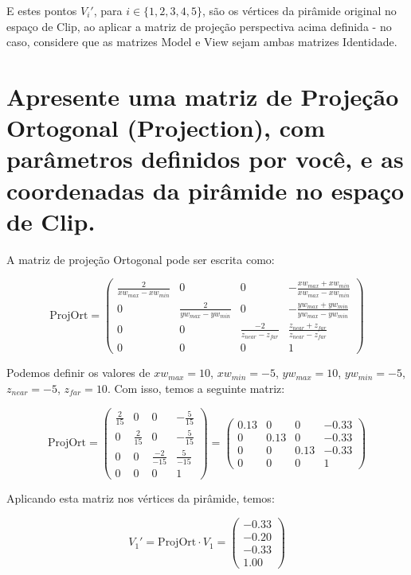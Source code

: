 \documentclass{article}
\begin{document}
E estes pontos $V_i'$, para $i \in \{1, 2, 3, 4, 5\}$, são os vértices da pirâmide original no espaço de Clip, ao aplicar a matriz de projeção perspectiva acima definida - no caso, considere que as matrizes Model e View sejam ambas matrizes Identidade.
\newpage

\section{Apresente uma matriz de Projeção Ortogonal (Projection), com parâmetros definidos por você, e as coordenadas da pirâmide no espaço de Clip.}

A matriz de projeção Ortogonal pode ser escrita como:

$$\text{ProjOrt} = \begin{pmatrix}
\frac{2}{xw_{max} - xw_{min}} & 0 & 0 & -\frac{xw_{max} + xw_{min}}{xw_{max} - xw_{min}} \\
0 & \frac{2}{yw_{max} - yw_{min}} & 0 & -\frac{yw_{max} + yw_{min}}{yw_{max} - yw_{min}} \\
0 & 0 & \frac{-2}{z_{near} - z_{far}} & \frac{z_{near} + z_{far}}{z_{near} - z_{far}} \\
0 & 0 & 0 & 1
\end{pmatrix}$$

Podemos definir os valores de $xw_{max} = 10$, $xw_{min} = -5$, $yw_{max} = 10$, $yw_{min} = -5$, $z_{near} = -5$, $z_{far} = 10$. Com isso, temos a seguinte matriz:

$$\text{ProjOrt} = \begin{pmatrix}
	\frac{2}{15} & 0 & 0 & -\frac{5}{15} \\
	0 & \frac{2}{15} & 0 & -\frac{5}{15} \\
	0 & 0 & \frac{-2}{-15} & \frac{5}{-15} \\
	0 & 0 & 0 & 1
\end{pmatrix} = \begin{pmatrix}
0.13 & 0 & 0 & -0.33 \\
0 & 0.13 & 0 & -0.33 \\
0 & 0 & 0.13 & -0.33 \\
0 & 0 & 0 & 1
\end{pmatrix}$$

Aplicando esta matriz nos vértices da pirâmide, temos:

$$V_1' = \text{ProjOrt} \cdot V_1 = \begin{pmatrix}
-0.33 \\
-0.20 \\
-0.33 \\
1.00 
\end{pmatrix}$$
\end{document}
